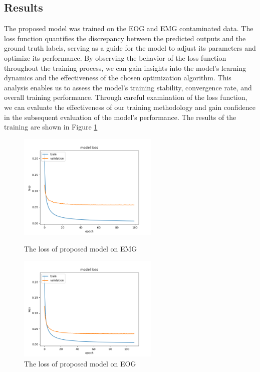 \documentclass[a4paper, noexaminfo]{sapthesis}
\begin{document}
\subsection{Results}
The proposed model was trained on the EOG and EMG contaminated
data. The loss function quantifies the discrepancy between the 
predicted outputs and the ground truth labels, serving as a 
guide for the model to adjust its parameters and optimize its 
performance. By observing the behavior of the loss function 
throughout the training process, we can gain insights into the 
model's learning dynamics and the effectiveness of the chosen 
optimization algorithm. This analysis enables us to assess the 
model's training stability, convergence rate, and overall training 
performance. Through careful examination of the loss function, 
we can evaluate the effectiveness of our training methodology 
and gain confidence in the subsequent evaluation of the model's 
performance. The results of the training are shown in 
Figure \ref{fig:results}
\begin{figure}[h!]
\centering
\includegraphics[width=0.6\textwidth]{./results/res_bigru_light_LReLU/EMG/loss.png}
\caption{The loss of proposed model on EMG}
\includegraphics[width=0.6\textwidth]{./results/res_bigru_light_LReLU/EOG/loss.png}
\caption{The loss of proposed model on EOG}
\label{fig:results}
\end{figure}
\end{document}
